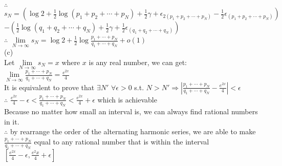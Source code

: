 \documentclass{article}
\begin{document}
$\therefore$ \qquad $\displaystyle s_N = \left(\log{2} + \frac{1}{2} \log{(p_1+p_2+\cdots+p_N)} + \frac{1}{2} \gamma + \epsilon_{2(p_1+p_2+\cdots+p_N)} - \frac{1}{2} \epsilon_{(p_1+p_2+\cdots+p_N)}\right)$\\

\hskip 1.57cm $\displaystyle - \left(\frac{1}{2} \log{(q_1+q_2+\cdots+q_N)} + \frac{1}{2} \gamma + \frac{1}{2}\epsilon_{(q_1+q_2+\cdots+q_N)}\right)$\\

$\therefore$ \qquad $\displaystyle \lim \limits_{N \to \infty} s_N = \log{2} + \frac{1}{2} \log{\frac{p_1+\cdots+p_N}{q_1+\cdots+q_N}} + o(1)$\\

(c)\\

Let $\displaystyle \lim \limits_{N \to \infty} s_N = x$ where $x$ is any real number, we can get:\\

$\displaystyle \lim \limits_{N \to \infty} \frac{p_1+\cdots+p_N}{q_1+\cdots+q_N} = \frac{e^{2x}}{4}$\\
 
It is equivalent to prove that $\exists N'$ \quad $\forall \epsilon > 0$ s.t. $\displaystyle N > N' \Rightarrow \left| \frac{p_1+\cdots+p_N}{q_1+\cdots+q_N} - \frac{e^{2x}}{4}\right| < \epsilon$\\

$\therefore$ \qquad $\displaystyle \frac{e^{2x}}{4} - \epsilon < \frac{p_1+\cdots+p_N}{q_1+\cdots+q_N} < \frac{e^{2x}}{4} + \epsilon$ which is achievable\\

Because no matter how small an interval is, we can always find rational numbers in it.\\

$\therefore$ \qquad by rearrange the order of the alternating harmonic series, we are able to make $\frac{p_1+\cdots+p_N}{q_1+\cdots+q_N}$ equal to any rational number that is within the interval $[\frac{e^{2x}}{4}-\epsilon, \frac{e^2x}{4}+\epsilon]$\\

\vskip 3cm
\end{document}
